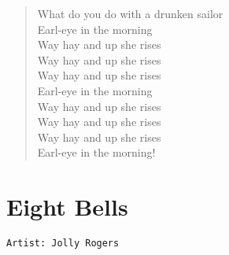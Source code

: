 \documentclass[11pt]{article}
\begin{document}
\begin{verse}
What do you do with a drunken sailor\\
Earl-eye in the morning\\
\vspace*{1em}
Way hay and up she rises\\
Way hay and up she rises\\
Way hay and up she rises\\
Earl-eye in the morning\\
\vspace*{1em}
Way hay and up she rises\\
Way hay and up she rises\\
Way hay and up she rises\\
Earl-eye in the morning!\\
\end{verse}
\clearpage
\section{Eight Bells}
\label{sec:org9aaac4f}
\begin{verbatim}
Artist: Jolly Rogers
\end{verbatim}
\end{document}

